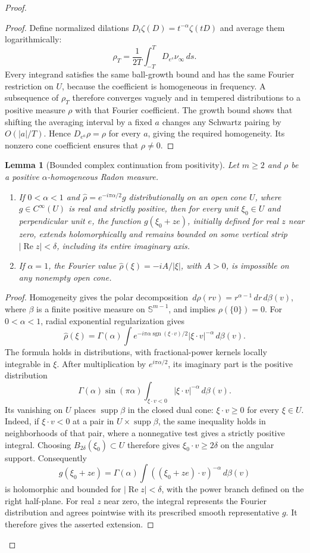 \documentclass[11pt]{article}
\newtheorem{lemma}[theorem]{Lemma}
\newcommand{\Sph}{\mathbb S}
\newcommand{\supp}{\operatorname{supp}}
\newcommand{\dd}{\,d}
\begin{document}
\begin{proof}
\begin{proof}
Define normalized dilations $D_t\zeta(D)=t^{-\alpha}\zeta(tD)$ and average them logarithmically:
\[
 \rho_T=\frac1{2T}\int_{-T}^{T}D_{e^s}\nu_\infty\dd s.
\]
Every integrand satisfies the same ball-growth bound and has the same Fourier restriction on $U$, because the coefficient is homogeneous in frequency. A subsequence of $\rho_T$ therefore converges vaguely and in tempered distributions to a positive measure $\rho$ with that Fourier coefficient. The growth bound shows that shifting the averaging interval by a fixed $a$ changes any Schwartz pairing by $O(|a|/T)$. Hence $D_{e^a}\rho=\rho$ for every $a$, giving the required homogeneity. Its nonzero cone coefficient ensures that $\rho\ne0$.
\end{proof}

\begin{lemma}[Bounded complex continuation from positivity]\label{lem:complexcone}
Let $m\ge2$ and $\rho$ be a positive $\alpha$-homogeneous Radon measure.
\begin{enumerate}
\item If $0<\alpha<1$ and $\widehat\rho=e^{-i\pi\alpha/2}g$ distributionally on an open cone $U$, where $g\in C^\infty(U)$ is real and strictly positive, then for every unit $\xi_0\in U$ and perpendicular unit $e$, the function $g(\xi_0+ze)$, initially defined for real $z$ near zero, extends holomorphically and remains bounded on some vertical strip $|\operatorname{Re}z|<\delta$, including its entire imaginary axis.
\item If $\alpha=1$, the Fourier value $\widehat\rho(\xi)=-iA/|\xi|$, with $A>0$, is impossible on any nonempty open cone.
\end{enumerate}
\end{lemma}
\begin{proof}
Homogeneity gives the polar decomposition $\dd\rho(rv)=r^{\alpha-1}\dd r\dd\beta(v)$, where $\beta$ is a finite positive measure on $\Sph^{m-1}$, and implies $\rho(\{0\})=0$. For $0<\alpha<1$, radial exponential regularization gives
\[
 \widehat\rho(\xi)=\Gamma(\alpha)\int
 e^{-i\pi\alpha\operatorname{sgn}(\xi\cdot v)/2}
 |\xi\cdot v|^{-\alpha}\dd\beta(v).
\]
The formula holds in distributions, with fractional-power kernels locally integrable in $\xi$. After multiplication by $e^{i\pi\alpha/2}$, its imaginary part is the positive distribution
\[
 \Gamma(\alpha)\sin(\pi\alpha)
 \int_{\xi\cdot v<0}|\xi\cdot v|^{-\alpha}\dd\beta(v).
\]
Its vanishing on $U$ places $\supp\beta$ in the closed dual cone: $\xi\cdot v\ge0$ for every $\xi\in U$. Indeed, if $\xi\cdot v<0$ at a pair in $U\times\supp\beta$, the same inequality holds in neighborhoods of that pair, where a nonnegative test gives a strictly positive integral. Choosing $B_{2\delta}(\xi_0)\subset U$ therefore gives $\xi_0\cdot v\ge2\delta$ on the angular support. Consequently
\[
 g(\xi_0+ze)=\Gamma(\alpha)\int
 ((\xi_0+ze)\cdot v)^{-\alpha}\dd\beta(v)
\]
is holomorphic and bounded for $|\operatorname{Re}z|<\delta$, with the power branch defined on the right half-plane. For real $z$ near zero, the integral represents the Fourier distribution and agrees pointwise with its prescribed smooth representative $g$. It therefore gives the asserted extension.


\end{proof}
\end{proof}
\end{document}
